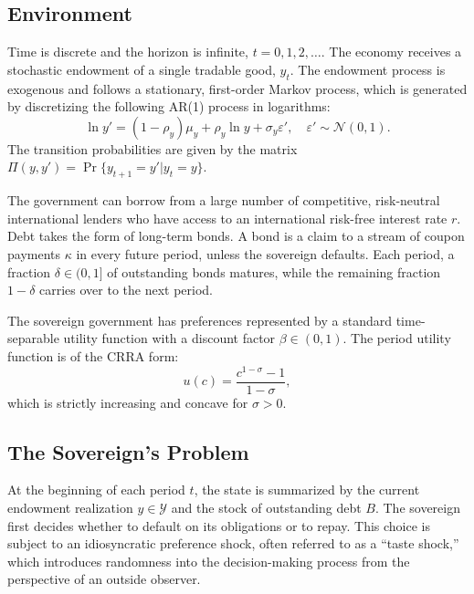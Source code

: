 \documentclass[12pt]{article}
\theoremstyle{plain}
\begin{document}
\subsection{Environment}
Time is discrete and the horizon is infinite, $t = 0, 1, 2, \dots$. The economy
receives a stochastic endowment of a single tradable good, $y_t$. The endowment
process is exogenous and follows a stationary, first-order Markov process,
which is generated by discretizing the following AR(1) process in logarithms:
\begin{equation}
	\ln y' = (1-\rho_y)\mu_y + \rho_y \ln y + \sigma_y \varepsilon', \quad \varepsilon' \sim \mathcal{N}(0, 1).
	\label{eq:endowment}
\end{equation}
The transition probabilities are given by the matrix $\Pi(y, y') = \Pr\{y_{t+1}=y'|y_t=y\}$.

The government can borrow from a large number of competitive, risk-neutral
international lenders who have access to an international risk-free interest
rate $r$. Debt takes the form of long-term bonds. A bond is a claim to a stream
of coupon payments $\kappa$ in every future period, unless the sovereign
defaults. Each period, a fraction $\delta \in (0, 1]$ of outstanding bonds
matures, while the remaining fraction $1-\delta$ carries over to the next
period.

The sovereign government has preferences represented by a standard
time-separable utility function with a discount factor $\beta \in (0, 1)$. The
period utility function is of the CRRA form:
\begin{equation}
	u(c) = \frac{c^{1-\sigma}-1}{1-\sigma},
\end{equation}
which is strictly increasing and concave for $\sigma > 0$.

\subsection{The Sovereign's Problem}
At the beginning of each period $t$, the state is summarized by the current
endowment realization $y \in \mathcal{Y}$ and the stock of outstanding debt
$B$. The sovereign first decides whether to default on its obligations or to
repay. This choice is subject to an idiosyncratic preference shock, often
referred to as a ``taste shock,'' which introduces randomness into the
decision-making process from the perspective of an outside observer.
\end{document}
